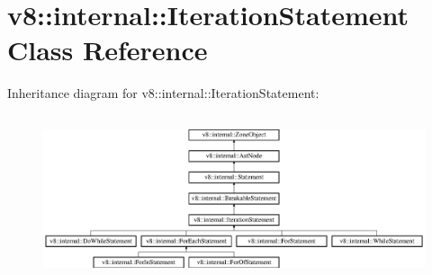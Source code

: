 \hypertarget{classv8_1_1internal_1_1_iteration_statement}{}\section{v8\+:\+:internal\+:\+:Iteration\+Statement Class Reference}
\label{classv8_1_1internal_1_1_iteration_statement}
Inheritance diagram for v8\+:\+:internal\+:\+:Iteration\+Statement\+:\begin{figure}[H]
\begin{center}
\leavevmode
\includegraphics[height=4.924623cm]{classv8_1_1internal_1_1_iteration_statement}
\end{center}
\end{figure}
